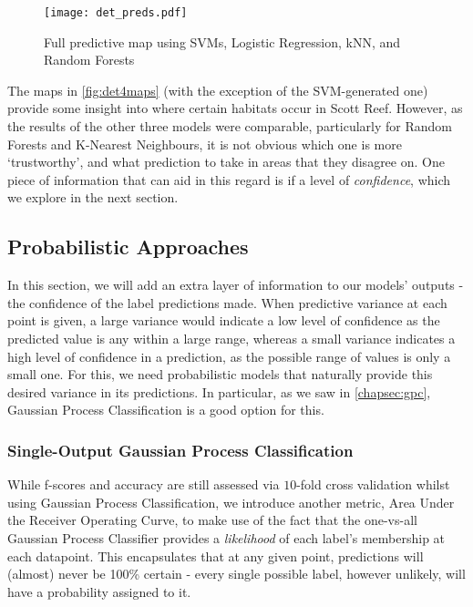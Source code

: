 \begin{figure}[H]
    \texttt{[image: det\_preds.pdf]}
    \caption{Full predictive map using SVMs, Logistic Regression, kNN, and Random Forests}
    \label{fig:det4maps}
\end{figure}

The maps in \autoref{fig:det4maps} (with the exception of the SVM-generated one) provide some insight into where certain habitats occur in Scott Reef. However, as the results of the other three models were comparable, particularly for Random Forests and K-Nearest Neighbours, it is not obvious which one is more `trustworthy', and what prediction to take in areas that they disagree on. One piece of information that can aid in this regard is if a level of \textit{confidence}, which we explore in the next section.

\subsection{Probabilistic Approaches}

In this section, we will add an extra layer of information to our models' outputs - the confidence of the label predictions made. When predictive variance at each point is given, a large variance would indicate a low level of confidence as the predicted value is any within a large range, whereas a small variance indicates a high level of confidence in a prediction, as the possible range of values is only a small one. For this, we need probabilistic models that naturally provide this desired variance in its predictions. In particular, as we saw in \autoref{chapsec:gpc}, Gaussian Process Classification is a good option for this.

\subsubsection{Single-Output Gaussian Process Classification}

While f-scores and accuracy are still assessed via $10$-fold cross validation whilst using Gaussian Process Classification, we introduce another metric, Area Under the Receiver Operating Curve, to make use of the fact that the one-vs-all Gaussian Process Classifier provides a \textit{likelihood} of each label's membership at each datapoint. This encapsulates that at any given point, predictions will (almost) never be 100\% certain - every single possible label, however unlikely, will have a probability assigned to it. 

